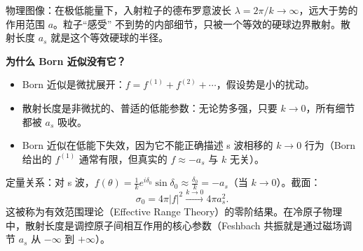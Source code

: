 \begin{insightbox}
物理图像：在极低能量下，入射粒子的德布罗意波长 $\lambda = 2\pi/k \to \infty$，远大于势的作用范围 $a$。粒子``感受'' 不到势的内部细节，只被一个等效的硬球边界散射。散射长度 $a_s$ 就是这个等效硬球的半径。

\textbf{为什么 Born 近似没有它？}
\begin{itemize}
    \item Born 近似是微扰展开：$f = f^{(1)} + f^{(2)} + \cdots$，假设势是小的扰动。
    \item 散射长度是非微扰的、普适的低能参数：无论势多强，只要 $k \to 0$，所有细节都被 $a_s$ 吸收。
    \item Born 近似在低能下失效，因为它不能正确描述 s 波相移的 $k \to 0$ 行为（Born 给出的 $f^{(1)}$ 通常有限，但真实的 $f \approx -a_s$ 与 $k$ 无关）。
\end{itemize}

定量关系：对 s 波，$f(\theta) = \frac{1}{k}e^{i\delta_0}\sin\delta_0 \approx \frac{\delta_0}{k} = -a_s$（当 $k \to 0$）。截面：
\[
\sigma_0 = 4\pi|f|^2 \xrightarrow{k\to 0} 4\pi a_s^2.
\]
这被称为有效范围理论（Effective Range Theory）的零阶结果。在冷原子物理中，散射长度是调控原子间相互作用的核心参数（Feshbach 共振就是通过磁场调节 $a_s$ 从 $-\infty$ 到 $+\infty$）。
\end{insightbox}

